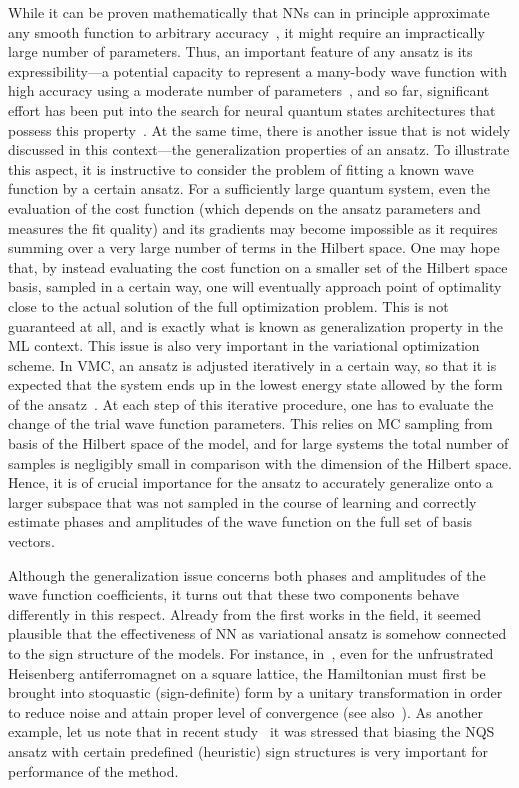 While it can be proven mathematically that NNs can in principle approximate any smooth function to arbitrary accuracy~\cite{hornik1989multilayer}, it might require an impractically large number of parameters. Thus, an important feature of any ansatz is its expressibility---a potential capacity to represent a many-body wave function with high accuracy using a moderate number of parameters~\cite{gao2017efficient,cai2018approximating,carleo2018constructing}, and so far, significant effort has been put into the search for neural quantum states architectures that possess this property~\cite{he2019multi,sehayek2019learnability}. At the same time, there is another issue that is not widely discussed in this context---the generalization properties of an ansatz. To illustrate this aspect, it is instructive to consider the problem of fitting a known wave function by a certain ansatz. For a sufficiently large quantum system, even the evaluation of the cost function (which depends on the ansatz parameters and measures the fit quality) and its gradients may become impossible as it requires summing over a very large number of terms in the Hilbert space. One may hope that, by instead evaluating the cost function on a smaller set of the Hilbert space basis, sampled in a certain way, one will eventually approach point of optimality close to the actual solution of the full optimization problem. This is not guaranteed at all, and is exactly what is known as generalization property in the ML context. This issue is also very important in the variational optimization scheme. In VMC, an ansatz is adjusted iteratively in a certain way, so that it is expected that the system ends up in the lowest energy state allowed by the form of the ansatz~\cite{sorella2001generalized,sorella2007weak,choo2019study}. At each step of this iterative procedure, one has to evaluate the change of the trial wave function parameters. This relies on  MC sampling from basis of the Hilbert space of the model, and for large systems the total number of samples is negligibly small in comparison with the dimension of the Hilbert space. Hence, it is of crucial importance for the ansatz to accurately generalize onto a larger subspace that was not sampled in the course of learning and correctly estimate phases and amplitudes of the wave function on the full set of basis vectors. 

Although the generalization issue concerns both phases and amplitudes of the wave function coefficients, it turns out that these two components behave differently in this respect. Already from the first works in the field, it seemed plausible that the effectiveness of NN as variational ansatz is somehow connected to the sign structure of the models. For instance, in~\cite{Carleo}, even for the unfrustrated Heisenberg antiferromagnet on a square lattice, the Hamiltonian must first be brought into stoquastic (sign-definite) form by a unitary transformation in order to reduce noise and attain proper level of convergence (see also~\cite{torlai2019wavefunction}). As another example, let us note that in recent study~\cite{choo2019study} it was stressed that biasing the NQS ansatz with certain predefined (heuristic) sign structures is very important for performance of the method.

